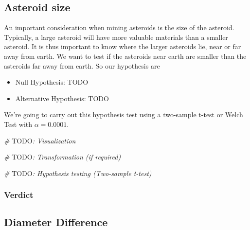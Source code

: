 \documentclass[
]{article}
\newenvironment{Shaded}{\begin{snugshade}}{\end{snugshade}}
\newcommand{\AlertTok}[1]{\textcolor[rgb]{0.94,0.16,0.16}{#1}}
\newcommand{\CommentTok}[1]{\textcolor[rgb]{0.56,0.35,0.01}{\textit{#1}}}
\begin{document}
\hypertarget{asteroid-size}{%
\subsection{Asteroid size}\label{asteroid-size}}

An important consideration when mining asteroids is the size of the
asteroid. Typically, a large asteroid will have more valuable materials
than a smaller asteroid. It is thus important to know where the larger
asteroids lie, near or far away from earth. We want to test if the
asteroids near earth are smaller than the asteroids far away from earth.
So our hypothesis are

\begin{itemize}
\item
  Null Hypothesis: TODO
\item
  Alternative Hypothesis: TODO
\end{itemize}

We're going to carry out this hypothesis test using a two-sample t-test
or Welch Test with \(\alpha = 0.0001\).

\begin{Shaded}
\begin{Highlighting}[]
\CommentTok{\# }\AlertTok{TODO}\CommentTok{: Visualization}
\end{Highlighting}
\end{Shaded}

\begin{Shaded}
\begin{Highlighting}[]
\CommentTok{\# }\AlertTok{TODO}\CommentTok{: Transformation (if required)}
\end{Highlighting}
\end{Shaded}

\begin{Shaded}
\begin{Highlighting}[]
\CommentTok{\# }\AlertTok{TODO}\CommentTok{: Hypothesis testing (Two{-}sample t{-}test)}
\end{Highlighting}
\end{Shaded}

\hypertarget{verdict-2}{%
\subsubsection{Verdict}\label{verdict-2}}

\hypertarget{diameter-difference}{%
\subsection{Diameter Difference}\label{diameter-difference}}
\end{document}
